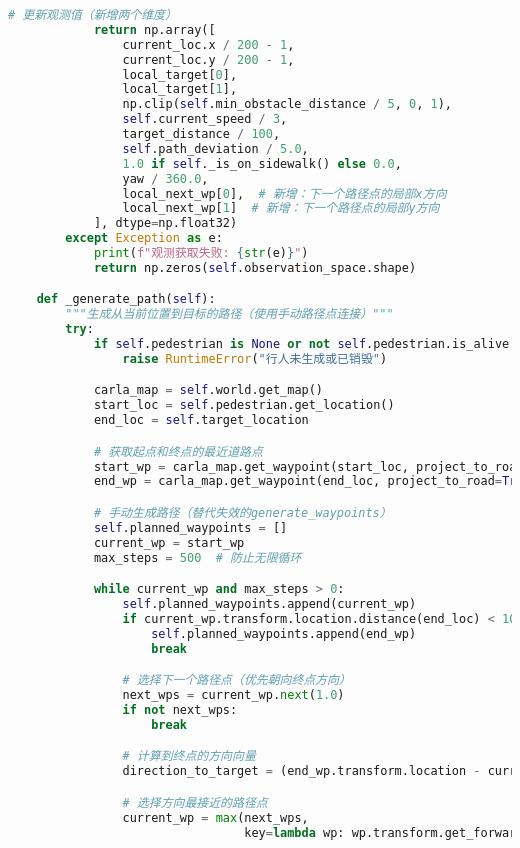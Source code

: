 \begin{lstlisting}[language=Python]
            # 更新观测值（新增两个维度）
            return np.array([
                current_loc.x / 200 - 1,
                current_loc.y / 200 - 1,
                local_target[0],
                local_target[1],
                np.clip(self.min_obstacle_distance / 5, 0, 1),
                self.current_speed / 3,
                target_distance / 100,
                self.path_deviation / 5.0,
                1.0 if self._is_on_sidewalk() else 0.0,
                yaw / 360.0,
                local_next_wp[0],  # 新增：下一个路径点的局部x方向
                local_next_wp[1]  # 新增：下一个路径点的局部y方向
            ], dtype=np.float32)
        except Exception as e:
            print(f"观测获取失败: {str(e)}")
            return np.zeros(self.observation_space.shape)

    def _generate_path(self):
        """生成从当前位置到目标的路径（使用手动路径点连接）"""
        try:
            if self.pedestrian is None or not self.pedestrian.is_alive:
                raise RuntimeError("行人未生成或已销毁")

            carla_map = self.world.get_map()
            start_loc = self.pedestrian.get_location()
            end_loc = self.target_location

            # 获取起点和终点的最近道路点
            start_wp = carla_map.get_waypoint(start_loc, project_to_road=True)
            end_wp = carla_map.get_waypoint(end_loc, project_to_road=True)

            # 手动生成路径（替代失效的generate_waypoints）
            self.planned_waypoints = []
            current_wp = start_wp
            max_steps = 500  # 防止无限循环

            while current_wp and max_steps > 0:
                self.planned_waypoints.append(current_wp)
                if current_wp.transform.location.distance(end_loc) < 10.0:
                    self.planned_waypoints.append(end_wp)
                    break

                # 选择下一个路径点（优先朝向终点方向）
                next_wps = current_wp.next(1.0)
                if not next_wps:
                    break

                # 计算到终点的方向向量
                direction_to_target = (end_wp.transform.location - current_wp.transform.location).make_unit_vector()

                # 选择方向最接近的路径点
                current_wp = max(next_wps,
                                 key=lambda wp: wp.transform.get_forward_vector().dot(direction_to_target))


\end{lstlisting}
